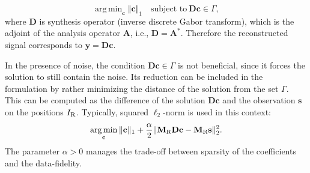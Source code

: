 \documentclass[conference]{IEEEtran}
\newcommand{\todo}[1]{\textcolor{red}{#1}}
\begin{document}
\begin{equation}
	\label{eq:synthesis.gamma}
	\mathop {\operatorname{arg \, min}}_\mathbf {c}\Vert \mathbf {c}\Vert _1 \quad \text{subject to}\ \mathbf{D}\mathbf {c}\in \Gamma,
\end{equation} 
where $\mathbf{D} $ is synthesis operator (inverse discrete Gabor transform), which is the adjoint of the analysis operator $ \mathbf{A} $, i.e., $ \mathbf{D} = \mathbf{A}^* $.
Therefore the reconstructed signal corresponds to $ \mathbf {y} =  \mathbf{D}\mathbf {c}$.


%
%		

In the presence of noise, the condition $\mathbf{D}\mathbf {c}\in \Gamma$ is not beneficial, since it forces the solution to still contain the noise.
Its reduction can be included in the formulation by rather minimizing the distance of the solution from the set $\Gamma$.
This can be computed as the difference of the solution $\mathbf{D}\mathbf{c}$ and the observation $\mathbf{s}$  on the positions $I_\textup{R}$.
Typically, squared $\ell_2$-norm is used in this context:
\begin{equation}
	\label{eq:synthesis.dist}
	\mathop {\operatorname{arg \, min}}_\mathbf {c}\Vert \mathbf {c}\Vert _1 + \frac{\alpha}{2} \Vert \mathbf{M}_{\textup{R}} \mathbf{D}\mathbf {c} - \mathbf{M}_{\textup{R}} \mathbf{s} \Vert^2_2.
\end{equation} 
The parameter $\alpha > 0$ manages the trade-off between sparsity of the coefficients and the data-fidelity.
\end{document}
